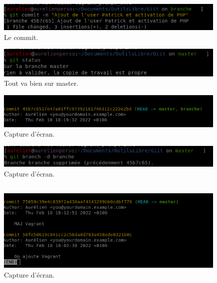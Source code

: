 \documentclass{article}
\begin{document}
\begin{figure}[h]
\centering
\includegraphics[width=1\columnwidth]{screen/git2_2.png}
\caption{\label{fig:frog}Le commit.}
\end{figure}

\begin{figure}[h]
\centering
\includegraphics[width=0.7\columnwidth]{screen/git2_3.png}
\caption{\label{fig:frog}Tout va bien sur master.}
\end{figure}

\begin{figure}[h]
\centering
\includegraphics[width=0.7\columnwidth]{screen/git2_4.png}
\caption{\label{fig:frog}Capture d'écran.}
\end{figure}

\begin{figure}[h]
\centering
\includegraphics[width=0.7\columnwidth]{screen/git2_5.png}
\caption{\label{fig:frog}Capture d'écran.}
\end{figure}

\subsection{}

\begin{figure}[h]
\centering
\includegraphics[width=0.7\columnwidth]{screen/git3.png}
\caption{\label{fig:frog}Capture d'écran.}
\end{figure}
\end{document}
